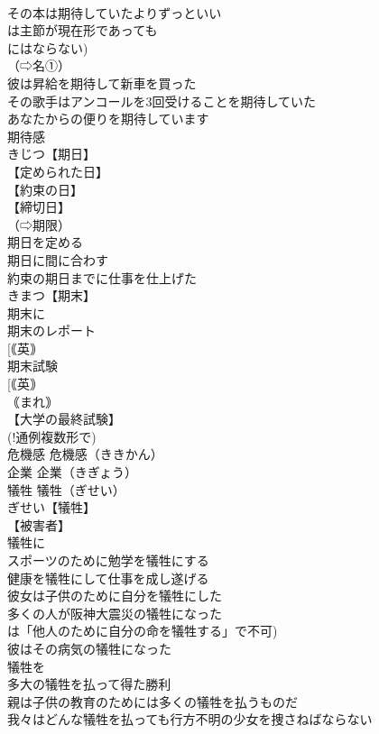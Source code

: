 \documentclass[8pt]{extreport}
\begin{document}
\begin{CJK}{UTF8}{min}
\\	その本は期待していたよりずっといい
\\	は主節が現在形であっても 
\\	にはならない)
\\	（⇨名①）
\\	彼は昇給を期待して新車を買った
\\	その歌手はアンコールを3回受けることを期待していた
\\	あなたからの便りを期待しています
\\	期待感
\\	きじつ【期日】
\\	【定められた日】
\\	【約束の日】
\\	【締切日】
\\	（⇨期限）
\\	期日を定める
\\	期日に間に合わす
\\	約束の期日までに仕事を仕上げた
\\	きまつ【期末】
\\	期末に
\\	期末のレポート
\\	[｟英｠ 
\\	期末試験
\\	[｟英｠ 
\\	｟まれ｠ 
\\	【大学の最終試験】
\\	(!通例複数形で) 
\\	危機感		危機感（ききかん）
\\	企業		企業（きぎょう）
\\	犠牲		犠牲（ぎせい）
\\	ぎせい【犠牲】
\\	【被害者】
\\	犠牲に
\\	スポーツのために勉学を犠牲にする
\\	健康を犠牲にして仕事を成し遂げる
\\	彼女は子供のために自分を犠牲にした
\\	多くの人が阪神大震災の犠牲になった
\\	は「他人のために自分の命を犠牲する」で不可)
\\	彼はその病気の犠牲になった
\\	犠牲を
\\	多大の犠牲を払って得た勝利
\\	親は子供の教育のためには多くの犠牲を払うものだ
\\	我々はどんな犠牲を払っても行方不明の少女を捜さねばならない

\end{CJK}
\end{document}
